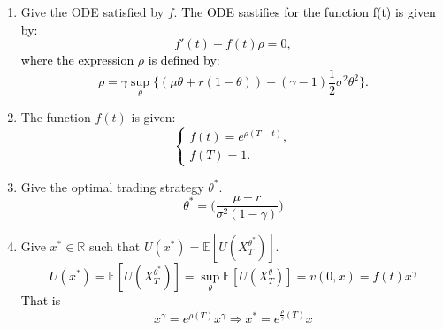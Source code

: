\documentclass[article,11pt]{amsart}
\numberwithin{equation}{section}
\newcommand{\1}{{\bf 1}}
\begin{document}
\begin{enumerate}[label=Q\arabic*., start=1]
{    }
    \item Give the ODE satisfied by $f$.
    \textcolor{black}{The ODE sastifies for the function f(t) is given by:
    \begin{equation*}
        f'(t) + f(t)\rho =0, 
    \end{equation*}
    where the expression $\rho$ is defined by:
    \begin{equation*}
        \rho = \gamma \sup_\theta \bigg\{  (\mu \theta + r(1-\theta)) + (\gamma-1) \frac{1}{2} \sigma^2 \theta^2 \bigg\}.
    \end{equation*}}
    \item The function $f(t)$ is given:
    \textcolor{black}{
    \begin{equation*}
        \begin{cases}
            f(t)= e^{\rho(T-t)},\\
            f(T)= 1.
        \end{cases}
    \end{equation*}
    }
    \item Give the optimal trading strategy $\theta^*$.
    \textcolor{black}{
    \begin{equation*}
                \theta^* = \Bigg( \frac{\mu-r}{\sigma^2(1-\gamma)}\Bigg)
    \end{equation*}}
    \item Give $x^* \in \mathbb{R}$ such that $U(x^*) = \mathbb{E}[U(X_T^{\theta^*})]$.
    \textcolor{black}{ 
    \begin{equation*}
        U(x^*) = \mathbb{E}[U(X_T^{\theta^*})] = \sup _\theta \mathbb{E}[U(X_T^{\theta})] = v(0,x) = f(t)x^\gamma
    \end{equation*}
    That is 
    \begin{equation*}
        x^\gamma = e^{\rho (T)} x^\gamma \Rightarrow x^* = e^{\frac{\rho}{\gamma} (T)}x
    \end{equation*}}
\end{enumerate}
\end{document}
